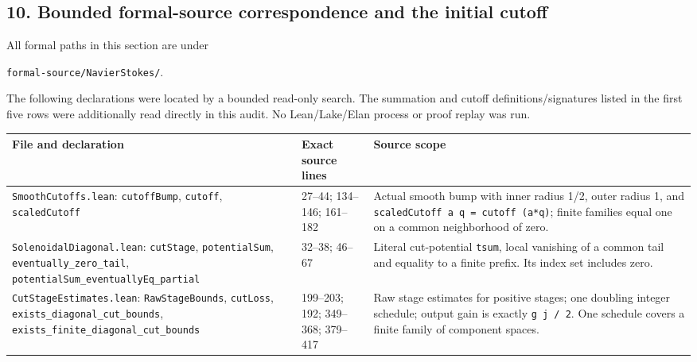 \documentclass[10pt,a4paper]{article}
\newcounter{none}
\begin{document}
\subsection{10. Bounded formal-source correspondence and the initial cutoff}\label{bounded-formal-source-correspondence-and-the-initial-cutoff}

All formal paths in this section are under

\texttt{formal-source/NavierStokes/}.

The following declarations were located by a bounded read-only search. The summation and cutoff definitions/signatures listed in the first five rows were additionally read directly in this audit. No Lean/Lake/Elan process or proof replay was run.

{\def\LTcaptype{none} %
\begin{longtable}[]{@{}
  >{\raggedright\arraybackslash}p{}
  >{\raggedright\arraybackslash}p{}
  >{\raggedright\arraybackslash}p{}@{}}
\toprule\noalign{}
\begin{minipage}[b]{\linewidth}\raggedright
File and declaration
\end{minipage} & \begin{minipage}[b]{\linewidth}\raggedright
Exact source lines
\end{minipage} & \begin{minipage}[b]{\linewidth}\raggedright
Source scope
\end{minipage} \\
\midrule\noalign{}
\endhead
\bottomrule\noalign{}
\endlastfoot
\nolinkurl{SmoothCutoffs.lean}: \nolinkurl{cutoffBump}, \nolinkurl{cutoff}, \nolinkurl{scaledCutoff} & {}27--44; 134--146; 161--182 & Actual smooth bump with inner radius 1/2, outer radius 1, and \texttt{scaledCutoff\ a\ q\ =\ cutoff\ (a*q)}; finite families equal one on a common neighborhood of zero. \\
\nolinkurl{SolenoidalDiagonal.lean}: \nolinkurl{cutStage}, \nolinkurl{potentialSum}, \nolinkurl{eventually_zero_tail}, \nolinkurl{potentialSum_eventuallyEq_partial} & {}32--38; 46--67 & Literal cut-potential \nolinkurl{tsum}, local vanishing of a common tail and equality to a finite prefix. Its index set includes zero. \\
\nolinkurl{CutStageEstimates.lean}: \nolinkurl{RawStageBounds}, \nolinkurl{cutLoss}, \nolinkurl{exists_diagonal_cut_bounds}, \nolinkurl{exists_finite_diagonal_cut_bounds} & {}199--203; 192; 349--368; 379--417 & Raw stage estimates for positive stages; one doubling integer schedule; output gain is exactly \texttt{g\ j\ /\ 2}. One schedule covers a finite family of component spaces. \\

\end{longtable}}
\end{document}
